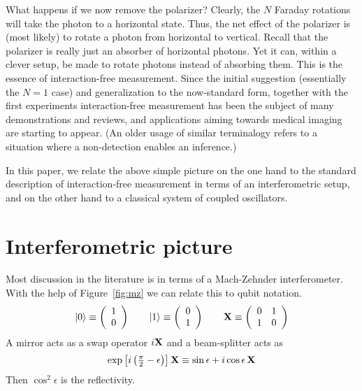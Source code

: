\documentclass[12pt,aps,prb,preprint]{revtex4}
\def\ket#1{|#1\rangle}
\def\X{{\bf X}}
\begin{document}
What happens if we now remove the polarizer?  Clearly, the $N$ Faraday
rotations will take the photon to a horizontal state.  Thus, the net
effect of the polarizer is (most likely) to rotate a photon from
horizontal to vertical.  Recall that the polarizer is really just an
absorber of horizontal photons.  Yet it can, within a clever setup, be
made to rotate photons instead of absorbing them.  This is the essence
of interaction-free measurement.  Since the initial suggestion
(essentially the $N=1$ case)\cite{1993FoPh...23..987E} and
generalization to the now-standard form, together with the first
experiments\cite{PhysRevLett.74.4763} interaction-free measurement has
been the subject of many
demonstrations\cite{voorthuysen:1504,2006JPhB...39.3177N} and
reviews,\cite{deweerd:272} and applications aiming towards medical
imaging are starting to appear\cite{PhysRevA.80.040902}.  (An older
usage of similar
terminalogy\cite{springerlink:10.1007/BF01327019,dicke:925} refers to
a situation where a non-detection enables an inference.)

In this paper, we relate the above simple picture on the one hand to
the standard description of interaction-free measurement in terms of
an interferometric setup, and on the other hand to a classical system
of coupled oscillators.

\section{Interferometric picture}

Most discussion in the literature is in terms of a Mach-Zehnder
interferometer.  With the help of Figure~{\ref{fig:mz}} we can relate
this to qubit notation.
\begin{equation}
\ket0 \equiv \left( \begin{array}{c} 1 \\ 0 \end{array} \right)  \qquad
\ket1 \equiv \left( \begin{array}{c} 0 \\ 1 \end{array} \right)  \qquad
\X \equiv \left( \begin{array}{cc} 0 & 1 \\ 1 & 0 \end{array} \right)
\end{equation}
A mirror acts as a swap operator $i\X$ and a beam-splitter acts as
\begin{equation}
\exp\left[i\left({\textstyle\frac\pi2-\epsilon}\right)\right] \X \equiv
\sin\epsilon + i\cos\epsilon\,\X
\end{equation}
Then $\cos^2\epsilon$ is the reflectivity.
\end{document}
